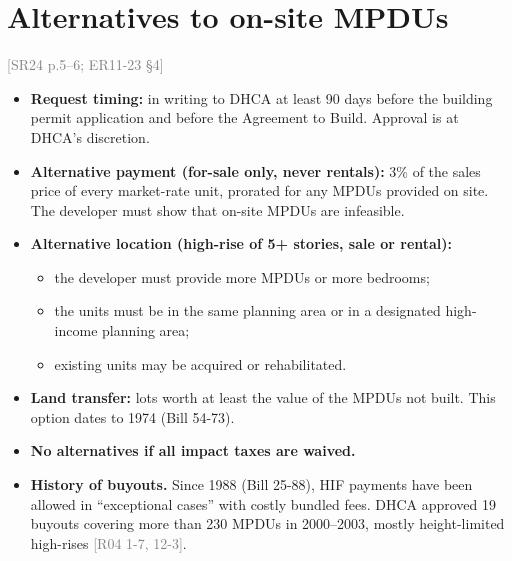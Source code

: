 \documentclass[11pt]{article}
\newcommand{\src}[1]{\textcolor{gray}{\small[#1]}}
\begin{document}
\section{Alternatives to on-site MPDUs}
\src{SR24 p.5--6; ER11-23 \S4}
\begin{itemize}
  \item \textbf{Request timing:} in writing to DHCA at least 90 days before the building permit application and before the Agreement to Build. Approval is at DHCA's discretion.
  \item \textbf{Alternative payment (for-sale only, never rentals):} 3\% of the sales price of every market-rate unit, prorated for any MPDUs provided on site. The developer must show that on-site MPDUs are infeasible.
  \item \textbf{Alternative location (high-rise of 5+ stories, sale or rental):}
    \begin{itemize}
      \item the developer must provide more MPDUs or more bedrooms;
      \item the units must be in the same planning area or in a designated high-income planning area;
      \item existing units may be acquired or rehabilitated.
    \end{itemize}
  \item \textbf{Land transfer:} lots worth at least the value of the MPDUs not built. This option dates to 1974 (Bill 54-73).
  \item \textbf{No alternatives if all impact taxes are waived.}
  \item \textbf{History of buyouts.} Since 1988 (Bill 25-88), HIF payments have been allowed in ``exceptional cases'' with costly bundled fees. DHCA approved 19 buyouts covering more than 230 MPDUs in 2000--2003, mostly height-limited high-rises \src{R04 1-7, 12-3}.
\end{itemize}

\end{document}
